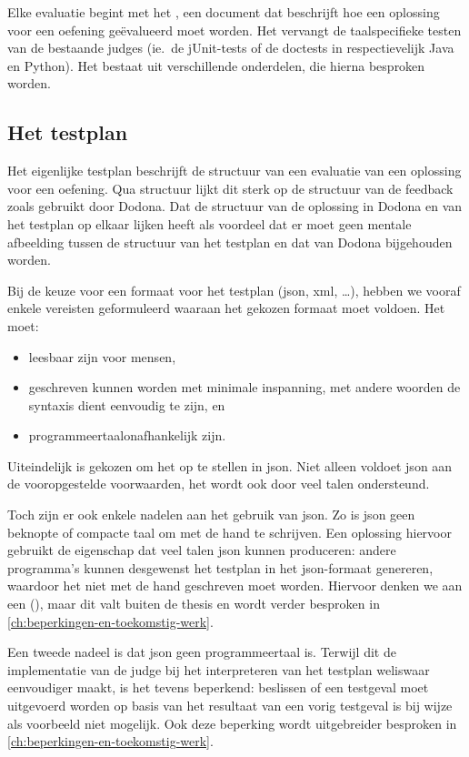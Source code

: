 Elke evaluatie begint met het , een document dat beschrijft hoe een oplossing voor een oefening geëvalueerd moet worden.
Het vervangt de taalspecifieke testen van de bestaande judges (ie.\ de jUnit-tests of de doctests in respectievelijk Java en Python).
Het bestaat uit verschillende onderdelen, die hierna besproken worden.

\subsection{Het testplan}\label{subsec:het-testplan}

Het eigenlijke testplan beschrijft de structuur van een evaluatie van een oplossing voor een oefening.
Qua structuur lijkt dit sterk op de structuur van de feedback zoals gebruikt door Dodona.
Dat de structuur van de oplossing in Dodona en van het testplan op elkaar lijken heeft als voordeel dat er moet geen mentale afbeelding tussen de structuur van het testplan en dat van Dodona bijgehouden worden.

Bij de keuze voor een formaat voor het testplan (json, xml, \ldots), hebben we vooraf enkele vereisten geformuleerd waaraan het gekozen formaat moet voldoen.
Het moet:

\begin{itemize}
    \item leesbaar zijn voor mensen,
    \item geschreven kunnen worden met minimale inspanning, met andere woorden de syntaxis dient eenvoudig te zijn, en
    \item programmeertaalonafhankelijk zijn.
\end{itemize}

Uiteindelijk is gekozen om het op te stellen in json.
Niet alleen voldoet json aan de vooropgestelde voorwaarden, het wordt ook door veel talen ondersteund.

Toch zijn er ook enkele nadelen aan het gebruik van json.
Zo is json geen beknopte of compacte taal om met de hand te schrijven.
Een oplossing hiervoor gebruikt de eigenschap dat veel talen json kunnen produceren: andere programma's kunnen desgewenst het testplan in het json-formaat genereren, waardoor het niet met de hand geschreven moet worden.
Hiervoor denken we aan een  (), maar dit valt buiten de thesis en wordt verder besproken in \cref{ch:beperkingen-en-toekomstig-werk}.

Een tweede nadeel is dat json geen programmeertaal is.
Terwijl dit de implementatie van de judge bij het interpreteren van het testplan weliswaar eenvoudiger maakt, is het tevens beperkend: beslissen of een testgeval moet uitgevoerd worden op basis van het resultaat van een vorig testgeval is bij wijze als voorbeeld niet mogelijk.
Ook deze beperking wordt uitgebreider besproken in \cref{ch:beperkingen-en-toekomstig-werk}.

